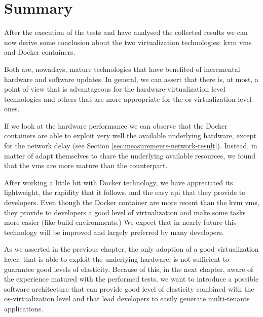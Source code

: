 %
%
\section{Summary}
\label{sec:measurements-summary}
After the execution of the tests and have analysed the collected results we can now derive some conclusion
about the two virtualization technologies: \ac{kvm} \ac{vm}s and Docker containers. 

Both are, nowadays, mature technologies that have benefited of incremental hardware and software updates.
In general, we can assert that there is, at most, a point of view that is advantageous for the hardware-virtualization
level technologies and others that are more appropriate for the \acs{os}-virtualization level ones.

If we look at the hardware performance we can observe that the Docker containers are able to exploit very well
the available underlying hardware, except for the network delay (see Section \ref{sec:measurements-network-result}).
Instead, in matter of adapt themselves to share the underlying available resources, we found that the
\ac{vm}s are more mature than the counterpart.

After working a little bit with Docker technology, we have appreciated its lightweight, the rapidity that
it follows, and the easy \acs{api} that they provide to developers. Even though the Docker container are more
recent than the \ac{kvm} \ac{vm}s, they provide to developers a good level of virtualization and make some tasks
more easier (like build environments.) We expect that in nearly future this technology will be improved and largely
preferred by many developers. 

As we asserted in the previous chapter, the only adoption of a good virtualization layer, that is able to exploit
the underlying hardware, is not sufficient to guarantee good levels of elasticity. Because of this, in the next
chapter, aware of the experience matured with the performed tests, we want to introduce a possible software
architecture that can provide good level of elasticity combined with the \acs{os}-virtualization level and that
lead developers to easily generate multi-tenants applications. 